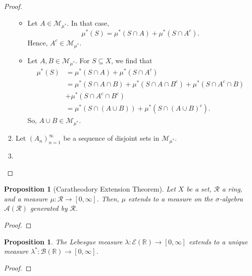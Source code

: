 \documentclass[a4paper, openany]{memoir}
\theoremstyle{definition}
\theoremstyle{plain}
\newtheorem{proposition}[definition]{Proposition}
\begin{document}
\begin{proof}
\begin{enumerate}
\begin{itemize}
                \item Let $A \in \mathcal{M}_{\mu^*}$. In that case,
                \[\mu^*(S) = \mu^*(S \cap A) + \mu^*(S \cap A^c).\]
                Hence, $A^c \in \mathcal{M}_{\mu^*}$.

                \item Let $A, B \in \mathcal{M}_{\mu^*}$. For $S \subseteq X$, we find that
                \begin{align*}
                    \mu^*(S) &= \mu^*(S \cap A) + \mu^*(S \cap A^c) \\
                    &= \mu^*(S \cap A \cap B) + \mu^*(S \cap A \cap B^c) + \mu^*(S \cap A^c \cap B) \\
                    &+ \mu^*(S \cap A^c \cap B^c) \\
                    &= \mu^*(S \cap (A \cup B)) + \mu^*(S \cap (A \cup B)^c).
                \end{align*}
                So, $A \cup B \in \mathcal{M}_{\mu^*}$.
            \end{itemize}

            \item Let $(A_n)_{n=1}^\infty$ be a sequence of disjoint sets in $\mathcal{M}_{\mu^*}$.
            
            \item 

            
        \end{enumerate}
    \end{proof}

    \begin{proposition}[Caratheodory Extension Theorem]
        Let $X$ be a set, $\mathcal{R}$ a ring, and a measure $\mu \colon \mathcal{R} \to [0, \infty]$. Then, $\mu$ extends to a measure on the $\sigma$-algebra $\mathcal{A}(\mathcal{R})$ generated by $\mathcal{R}$.
    \end{proposition}
    \begin{proof}
        
    \end{proof}

    \begin{proposition}
        The Lebesgue measure $\lambda \colon \mathcal{E}(\mathbb{R}) \to [0, \infty]$ extends to a unique measure $\lambda^* \colon \mathcal{B}(\mathbb{R}) \to [0, \infty]$.
    \end{proposition}
    \begin{proof}
        
    \end{proof}
\end{document}
